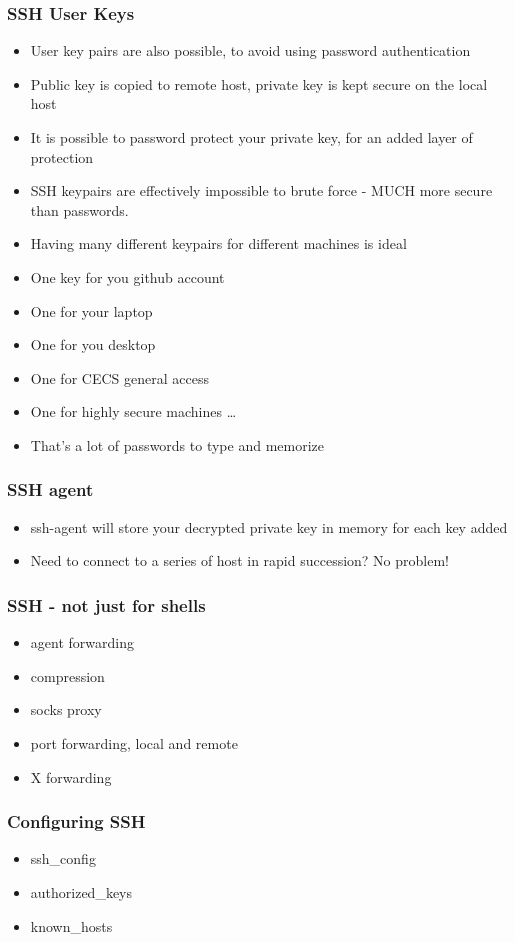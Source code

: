 \documentclass{beamer}
\begin{document}
\begin{frame}
  \frametitle{SSH User Keys}
  \begin{itemize}
    \item User key pairs are also possible, to avoid using password authentication
    \item Public key is copied to remote host, private key is kept secure on the local host
    \item It is possible to password protect your private key, for an added layer of protection
    \item SSH keypairs are effectively impossible to brute force - MUCH more secure than passwords.
      \pause
    \item Having many different keypairs for different machines is ideal
    \item One key for you github account
    \item One for your laptop
    \item One for you desktop
    \item One for CECS general access
    \item One for highly secure machines
      \pause
    \ldots
    \item That's a lot of passwords to type and memorize
  \end{itemize}
\end{frame}

\begin{frame}
  \frametitle{SSH agent}
  \begin{itemize}
    \item ssh-agent will store your decrypted private key in memory for each key added
    \item Need to connect to a series of host in rapid succession? No problem!
  \end{itemize}
\end{frame}

\begin{frame}
  \frametitle{SSH - not just for shells}
  \begin{itemize}
    \item agent forwarding
    \item compression
    \item socks proxy
    \item port forwarding, local and remote
    \item X forwarding
  \end{itemize}
\end{frame}

\begin{frame}
  \frametitle{Configuring SSH}
  \begin{itemize}
    \item ssh\_config
    \item authorized\_keys
    \item known\_hosts
  \end{itemize}
\end{frame}
\end{document}
